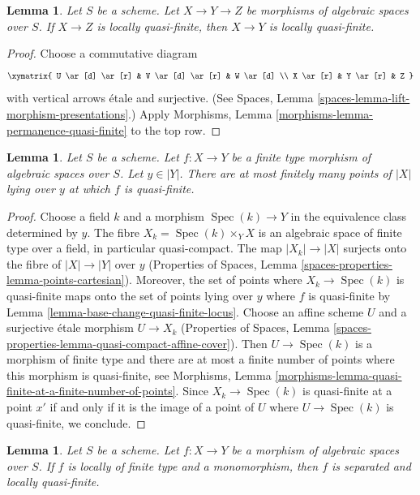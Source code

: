 \documentclass{stacks-project}
\theoremstyle{plain}
\newtheorem{lemma}[subsection]{Lemma}
\theoremstyle{definition}
\theoremstyle{remark}
\numberwithin{equation}{subsection}
\def\Spec{\mathop{\mathrm{Spec}}}
\begin{document}
\begin{lemma}
\label{lemma-permanence-quasi-finite}
Let $S$ be a scheme.
Let $X \to Y \to Z$ be morphisms of algebraic spaces over $S$.
If $X \to Z$ is locally quasi-finite, then $X \to Y$
is locally quasi-finite.
\end{lemma}

\begin{proof}
Choose a commutative diagram
$$
\xymatrix{
U \ar[d] \ar[r] & V \ar[d] \ar[r] & W \ar[d] \\
X \ar[r] & Y \ar[r] & Z
}
$$
with vertical arrows \'etale and surjective. (See
Spaces, Lemma \ref{spaces-lemma-lift-morphism-presentations}.)
Apply
Morphisms, Lemma \ref{morphisms-lemma-permanence-quasi-finite}
to the top row.
\end{proof}

\begin{lemma}
\label{lemma-quasi-finite-at-a-finite-number-of-points}
Let $S$ be a scheme. Let $f : X \to Y$ be a finite type
morphism of algebraic spaces over $S$. Let $y \in |Y|$.
There are at most finitely many
points of $|X|$ lying over $y$ at which $f$ is quasi-finite.
\end{lemma}

\begin{proof}
Choose a field $k$ and a morphism $\Spec(k) \to Y$ in the equivalence
class determined by $y$. The fibre $X_k = \Spec(k) \times_Y X$ is an
algebraic space of finite type over a field, in particular quasi-compact.
The map $|X_k| \to |X|$ surjects onto the fibre of $|X| \to |Y|$
over $y$ (Properties of Spaces, Lemma
\ref{spaces-properties-lemma-points-cartesian}).
Moreover, the set of points where $X_k \to \Spec(k)$ is
quasi-finite maps onto the set of points lying over $y$ where
$f$ is quasi-finite by Lemma \ref{lemma-base-change-quasi-finite-locus}.
Choose an affine scheme $U$ and a surjective \'etale morphism $U \to X_k$
(Properties of Spaces, Lemma
\ref{spaces-properties-lemma-quasi-compact-affine-cover}).
Then $U \to \Spec(k)$ is a morphism of finite type and there are at
most a finite number of points where this morphism is quasi-finite,
see Morphisms, Lemma
\ref{morphisms-lemma-quasi-finite-at-a-finite-number-of-points}.
Since $X_k \to \Spec(k)$ is quasi-finite at a point $x'$ if and only
if it is the image of a point of $U$ where $U \to \Spec(k)$ is
quasi-finite, we conclude.
\end{proof}

\begin{lemma}
\label{lemma-monomorphism-loc-finite-type-loc-quasi-finite}
Let $S$ be a scheme.
Let $f : X \to Y$ be a morphism of algebraic spaces over $S$.
If $f$ is locally of finite type and a monomorphism, then $f$
is separated and locally quasi-finite.
\end{lemma}
\end{document}
